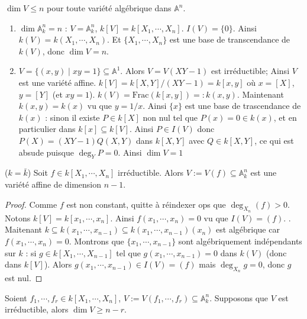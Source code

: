             \begin{remq}
                $\dim V \leq n$ pour toute variété algébrique dans $\mathbb{A}^n$.
            \end{remq}
            \begin{expl}
                \begin{enumerate}
                    \item $\dim \mathbb{A}_k^n = n$ : $V = \mathbb{A}_k^n$, $k[V] = k[X_1, \cdots, X_n]$. $I(V) = \{0\}$. Ainsi \linebreak $k(V) = k(X_1, \cdots, X_n)$. Et $\{X_1, \cdots, X_n\}$ est une base de transcendance de $k(V)$, donc $\dim V = n$.
                    \item $V = \{(x,y) \mid xy = 1\} \subseteq \mathbb{A}^1$. Alors $V = V(XY - 1)$ est irréductible; Ainsi $V$ est une variété affine. $k[V] = k[X,Y]/(XY - 1) = k[x,y]$ où $x = [X]$, $y = [Y]$ (et $xy = 1$). $k(V) = \mathrm{Frac} (k[x,y]) =: k(x,y)$. Maintenant $k(x,y) = k(x)$ vu que $y = 1/x$. Ainsi $\{x\}$ est une base de trascendance de $k(x)$ : sinon il existe $P \in k[X]$ non nul tel que $P(x) = 0 \in k(x)$, et en particulier dans $k[x] \subseteq k[V]$. Ainsi $P \in I(V)$ donc $P(X) = (XY - 1)Q(X,Y)$ dans $k[X,Y]$ avec $Q \in k[X,Y]$, ce qui est absude puisque $\deg_YP = 0$. Ainsi $\dim V = 1$
                \end{enumerate} 
            \end{expl}
            \begin{lemm}
                ($k = \bar k$) Soit $f \in k[X_1, \cdots, X_n]$ irréductible. Alors $V := V(f) \subseteq \mathbb{A}_k^n$ est une variété affine de dimension $n-1$.
            \end{lemm}
            \begin{proof}
                Comme $f$ est non constant, quitte à réindexer ops que $\deg_{X_n}(f) > 0$. Notons $k[V] = k[x_1, \cdots, x_n]$. Ainsi $f(x_1, \cdots, x_n) = 0$ vu que $I(V) = (f)$. . Maitenant $k \subseteq k(x_1, \cdots, x_{n-1}) \subseteq k(x_1, \cdots, x_{n-1})(x_n)$ est algébrique car $f(x_1, \cdots, x_n) = 0$. Montrons que $\{x_1, \cdots, x_{n-1}\}$ sont algébriquement indépendants sur $k$ : si $g \in k[X_1, \cdots, X_{n-1}]$ tel que $g(x_1, \cdots, x_{n-1}) = 0$ dans $k(V)$ (donc dans $k[V]$). Alors $g(x_1, \cdots, x_{n-1}) \in I(V) = (f)$ mais $\deg_{X_n} g = 0$, donc $g$ est nul.
            \end{proof}
            \begin{remq}
                \label{rq113}
                Soient $f_1, \cdots, f_r \in k[X_1, \cdots, X_n]$, $V := V(f_1, \cdots, f_r) \subseteq \mathbb{A}^n_k$. Supposons que $V$ est irréductible, alors $\dim V \geq n-r$. 
            \end{remq}
